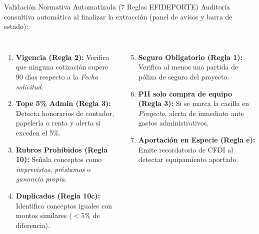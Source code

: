 \documentclass[aspectratio=169, 11pt]{beamer}
\begin{document}
\begin{frame}{Validación Normativa Automatizada (7 Reglas EFIDEPORTE)}
    Auditoría consultiva automática al finalizar la extracción (panel de avisos y barra de estado):

    \vspace{0.3cm}
    \begin{columns}[T]
        \begin{enumerate}
            \item \textbf{Vigencia (Regla 2):} Verifica que ninguna cotización supere 90 días respecto a la \textit{Fecha solicitud}.
            \item \textbf{Tope 5\% Admin (Regla 3):} Detecta honorarios de contador, papelería o renta y alerta si exceden el 5\%.
            \item \textbf{Rubros Prohibidos (Regla 10):} Señala conceptos como \textit{imprevistos}, \textit{préstamos} o \textit{ganancia propia}.
            \item \textbf{Duplicados (Regla 10c):} Identifica conceptos iguales con montos similares ($<5\%$ de diferencia).
        \end{enumerate}

        \begin{enumerate}
            \setcounter{enumi}{4}
            \item \textbf{Seguro Obligatorio (Regla 1):} Verifica al menos una partida de póliza de seguro del proyecto.
            \item \textbf{PII solo compra de equipo (Regla 3):} Si se marca la casilla en \textit{Proyecto}, alerta de inmediato ante gastos administrativos.
            \item \textbf{Aportación en Especie (Regla e):} Emite recordatorio de CFDI al detectar equipamiento aportado.
        \end{enumerate}

        \vspace{0.25cm}
    \end{columns}
\end{frame}
\end{document}
